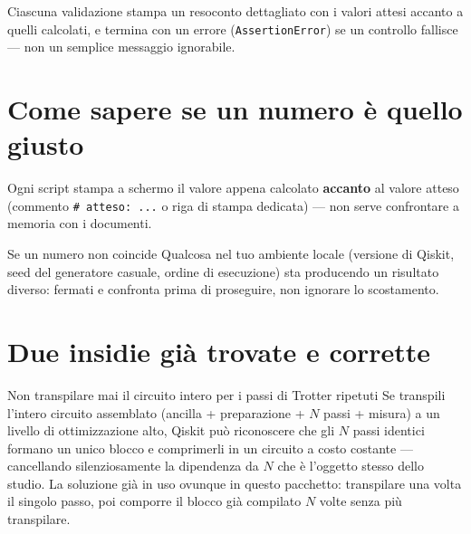 \documentclass[11pt,a4paper]{article}
\newcommand{\code}[1]{\texttt{\small #1}}
\begin{document}
Ciascuna validazione stampa un resoconto dettagliato con i valori
attesi accanto a quelli calcolati, e termina con un errore
(\code{AssertionError}) se un controllo fallisce --- non un semplice
messaggio ignorabile.


\section{Come sapere se un numero è quello giusto}

Ogni script stampa a schermo il valore appena calcolato \textbf{accanto}
al valore atteso (commento \code{\# atteso: ...} o riga di stampa
dedicata) --- non serve confrontare a memoria con i documenti.

\begin{warnbox}{Se un numero non coincide}
Qualcosa nel tuo ambiente locale (versione di Qiskit, seed del
generatore casuale, ordine di esecuzione) sta producendo un risultato
diverso: fermati e confronta prima di proseguire, non ignorare lo
scostamento.
\end{warnbox}

\section{Due insidie già trovate e corrette}

\begin{warnbox}{Non transpilare mai il circuito intero per i passi di Trotter ripetuti}
Se transpili l'intero circuito assemblato (ancilla + preparazione + $N$
passi + misura) a un livello di ottimizzazione alto, Qiskit può
riconoscere che gli $N$ passi identici formano un unico blocco e
comprimerli in un circuito a costo costante --- cancellando
silenziosamente la dipendenza da $N$ che è l'oggetto stesso dello
studio. La soluzione già in uso ovunque in questo pacchetto: transpilare
una volta il singolo passo, poi comporre il blocco già compilato $N$
volte senza più transpilare.
\end{warnbox}
\end{document}
